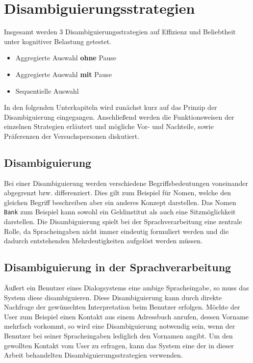 \documentclass[12pt,a4paper]{scrartcl}
\begin{document}
\section{Disambiguierungsstrategien}
\label{disambiguierungsstrategien}
Insgesamt werden 3 Disambiguierungsstrategien auf Effizienz und Beliebtheit unter kognitiver Belastung getestet.
\begin{itemize}
\item Aggregierte Auswahl \textbf{ohne} Pause
\item Aggregierte Auswahl \textbf{mit} Pause
\item Sequentielle Auswahl
\end{itemize}
In den folgenden Unterkapiteln wird zunächst kurz auf das Prinzip der Disambiguierung eingegangen. Anschließend werden die Funktionsweisen der einzelnen Strategien erläutert und mögliche Vor- und Nachteile, sowie Präferenzen der Versuchspersonen diskutiert.


\subsection{Disambiguierung}
Bei einer Disambiguierung werden verschiedene Begriffsbedeutungen voneinander abgegrenzt bzw. differenziert. Dies gilt zum Beispiel für Nomen, welche den gleichen Begriff beschreiben aber ein anderes Konzept darstellen. Das Nomen \texttt{Bank} zum Beispiel kann sowohl ein Geldinstitut als auch eine Sitzmöglichkeit darstellen. Die Disambiguierung spielt bei der Sprachverarbeitung eine zentrale Rolle, da Spracheingaben nicht immer eindeutig formuliert werden und die dadurch entstehenden Mehrdeutigkeiten aufgelöst werden müssen. 
\subsection{Disambiguierung in der Sprachverarbeitung}
Äußert ein Benutzer eines Dialogsystems eine ambige Spracheingabe, so muss das System diese disambiguieren. Diese Disambiguierung kann durch direkte Nachfrage der gewünschten Interpretation beim Benutzer erfolgen. 
Möchte der User zum Beispiel einen Kontakt aus einem Adressbuch anrufen, dessen Vorname mehrfach vorkommt, so wird eine Disambiguierung notwendig sein, wenn der Benutzer bei seiner Spracheingaben lediglich den Vornamen angibt. Um den gewollten Kontakt vom User zu erfragen, kann das System eine der in dieser Arbeit behandelten Disambiguierungsstrategien verwenden. 
\end{document}
